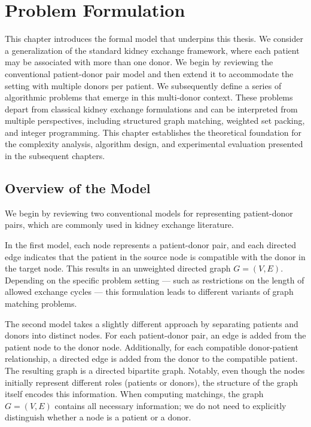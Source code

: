 \chapter{Problem Formulation}
\label{cha:problem_formulation}

This chapter introduces the formal model that underpins this thesis. We consider a generalization of the standard kidney exchange framework, where each patient may be associated with more than one donor. We begin by reviewing the conventional patient-donor pair model and then extend it to accommodate the setting with multiple donors per patient. We subsequently define a series of algorithmic problems that emerge in this multi-donor context. These problems depart from classical kidney exchange formulations and can be interpreted from multiple perspectives, including structured graph matching, weighted set packing, and integer programming. This chapter establishes the theoretical foundation for the complexity analysis, algorithm design, and experimental evaluation presented in the subsequent chapters.

\section{Overview of the Model}

We begin by reviewing two conventional models for representing patient-donor pairs, which are commonly used in kidney exchange literature.

In the first model, each node represents a patient-donor pair, and each directed edge indicates that the patient in the source node is compatible with the donor in the target node. This results in an unweighted directed graph $G = (V, E)$. Depending on the specific problem setting — such as restrictions on the length of allowed exchange cycles — this formulation leads to different variants of graph matching problems.

The second model takes a slightly different approach by separating patients and donors into distinct nodes. For each patient-donor pair, an edge is added from the patient node to the donor node. Additionally, for each compatible donor-patient relationship, a directed edge is added from the donor to the compatible patient. The resulting graph is a directed bipartite graph. Notably, even though the nodes initially represent different roles (patients or donors), the structure of the graph itself encodes this information. When computing matchings, the graph $G = (V, E)$ contains all necessary information; we do not need to explicitly distinguish whether a node is a patient or a donor.

